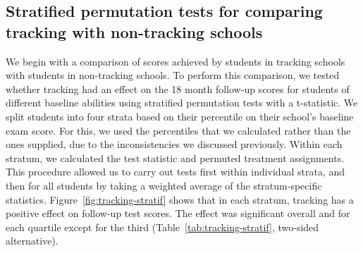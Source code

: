 \documentclass[11pt]{article}
\begin{document}
 \subsection{Stratified permutation tests for comparing tracking with non-tracking schools}

We begin with a comparison of scores achieved by students in tracking schools with students in non-tracking schools. To perform this comparison, we tested whether tracking had an effect on the 18 month follow-up scores for students of different baseline abilities using stratified permutation tests with a t-statistic. We split students into four strata based on their percentile on their school's baseline exam score.  For this, we used the percentiles that we calculated rather than the ones supplied, due to the inconsistencies we discussed previously.  Within each stratum, we calculated the test statistic and permuted treatment assignments.  This procedure allowed us to carry out tests first within individual strata, and then for all students by taking a weighted average of the stratum-specific statistics.  Figure~\ref{fig:tracking-stratif} shows that in each stratum, tracking has a positive effect on follow-up test scores.  The effect was significant overall and for each quartile except for the third (Table~\ref{tab:tracking-stratif}, two-sided alternative). \\
\end{document}
